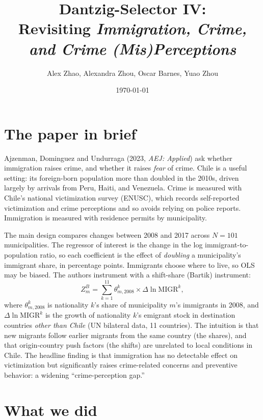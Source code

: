 \documentclass[11pt]{article}
\title{Dantzig-Selector IV:\\Revisiting \emph{Immigration, Crime, and Crime (Mis)Perceptions}}
\author{Alex Zhao, Alexandra Zhou, Oscar Barnes, Yuao Zhou}
\date{\today}
\begin{document}
\maketitle

\section{The paper in brief}

Ajzenman, Dominguez and Undurraga (2023, \emph{AEJ: Applied}) ask whether immigration
raises crime, and whether it raises \emph{fear} of crime. Chile is a useful setting: its
foreign-born population more than doubled in the 2010s, driven largely by arrivals from
Peru, Haiti, and Venezuela. Crime is measured with Chile's national victimization survey
(ENUSC), which records self-reported victimization and crime perceptions and so avoids
relying on police reports. Immigration is measured with residence permits by
municipality.

The main design compares changes between 2008 and 2017 across $N = 101$ municipalities.
The regressor of interest is the change in the log immigrant-to-population ratio, so each
coefficient is the effect of \emph{doubling} a municipality's immigrant share, in
percentage points. Immigrants choose where to live, so OLS may be biased. The authors
instrument with a shift-share (Bartik) instrument:
\[
  Z^{B}_m = \sum_{k=1}^{11} \theta^{k}_{m,2008} \times \Delta \ln \mathrm{MIGR}^{k},
\]
where $\theta^{k}_{m,2008}$ is nationality $k$'s share of municipality $m$'s immigrants in
2008, and $\Delta \ln \mathrm{MIGR}^{k}$ is the growth of nationality $k$'s emigrant stock
in destination countries \emph{other than Chile} (UN bilateral data, 11 countries). The
intuition is that new migrants follow earlier migrants from the same country (the
shares), and that origin-country push factors (the shifts) are unrelated to local
conditions in Chile. The headline finding is that immigration has no detectable effect on
victimization but significantly raises crime-related concerns and preventive behavior: a
widening ``crime-perception gap.''

\section{What we did}
\end{document}

